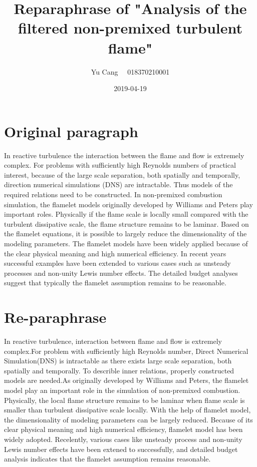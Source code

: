 \documentclass[paper=a4, fontsize=11pt]{scrartcl}
\title{Reparaphrase of "Analysis of the filtered non-premixed turbulent flame"}
\author{Yu Cang \ \ 018370210001}
\date{2019-04-19}
\begin{document}
\maketitle

\section{Original paragraph}
	In reactive turbulence the interaction between the flame and
	flow is extremely complex. For problems with sufficiently high Reynolds numbers of practical interest, because of the large scale separation, both spatially and temporally, direction numerical simulations (DNS) are intractable. Thus models of the required relations need to be constructed. In non-premixed combustion simulation, the flamelet models originally developed by Williams and Peters play important roles. Physically if the flame scale is locally small compared with the turbulent dissipative scale, the flame structure remains to be laminar. Based on the flamelet equations, it is possible to largely reduce the dimensionality of the modeling parameters. The flamelet models have been widely applied because of the clear physical meaning and high numerical efficiency. In recent years successful examples have been extended to various cases such as unsteady processes and non-unity Lewis number effects. The detailed budget analyses suggest that typically the flamelet assumption remains to be reasonable.

\section{Re-paraphrase}
	In reactive turbulence, interaction between flame and flow is extremely complex.For problem with sufficiently high Reynolds number, Direct Numerical Simulation(DNS) is intractable as there exists large scale separation, both spatially and temporally. To describle inner relations, properly constructed models are needed.As originally developed by Williams and Peters, the flamelet model play an important role in the simulation of non-premixed combustion. Physically, the local flame structure remains to be laminar when flame scale is smaller than turbulent dissipative scale locally. With the help of flamelet model, the dimensionality of modeling parameters can be largely reduced. Because of its clear physical meaning and high numerical efficiency, flamelet model has been widely adopted. Recelently, various cases like unsteady process and non-unity Lewis number effects have been extened to successfully, and detailed budget analysis indicates that the flamelet assumption remains reasonable.
	
\end{document}
